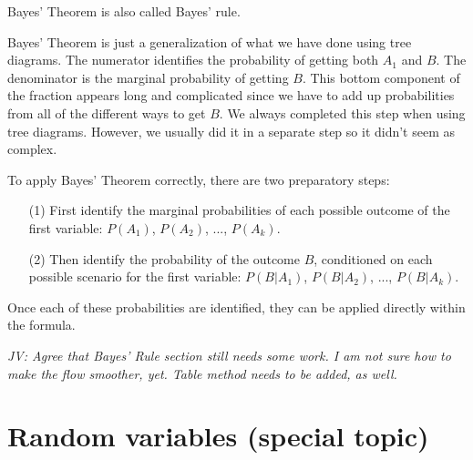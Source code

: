 \begin{doublespace}
Bayes' Theorem is also called Bayes' rule.

Bayes' Theorem is just a generalization of what we have done using tree diagrams. The numerator identifies the probability of getting both $A_1$ and $B$. The denominator is the marginal probability of getting $B$. This bottom component of the fraction appears long and complicated since we have to add up probabilities from all of the different ways to get $B$. We always completed this step when using tree diagrams. However, we usually did it in a separate step so it didn't seem as complex.

To apply Bayes' Theorem correctly, there are two preparatory steps:
\begin{enumerate}
\setlength{\itemsep}{0mm}
\item[(1)] First identify the marginal probabilities of each possible outcome of the first variable: $P(A_1)$, $P(A_2)$, ..., $P(A_k)$.
\item[(2)] Then identify the probability of the outcome $B$, conditioned on each possible scenario for the first variable: $P(B | A_1)$, $P(B | A_2)$, ..., $P(B | A_k)$.
\end{enumerate}
Once each of these probabilities are identified, they can be applied directly within the formula.

\textit{JV: Agree that Bayes' Rule section still needs some work. I am not sure how to make the flow smoother, yet. Table method needs to be added, as well.}

%





\textC{\newpage}



\section{Random variables (special topic)}
\label{randomVariablesSection}



\end{doublespace}
